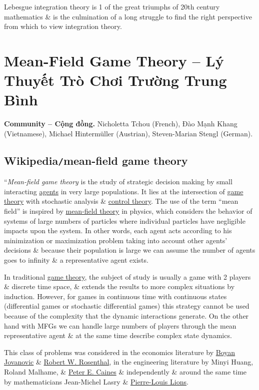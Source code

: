 \documentclass{article}
\begin{document}
Lebesgue integration theory is 1 of the great triumphs of 20th century mathematics \& is the culmination of a long struggle to find the right perspective from which to view integration theory.


\section{Mean-Field Game Theory -- Lý Thuyết Trò Chơi Trường Trung Bình}
\textbf{\textsf{Community -- Cộng đồng.}} {\sc Nicholetta Tchou (French), Đào Mạnh Khang (Vietnamese), Michael Hinterm\"uller (Austrian), Steven-Marian Stengl (German)}.

\subsection{Wikipedia{\tt/}mean-field game theory}
``{\it Mean-field game theory} is the study of strategic decision making by small interacting \href{https://en.wikipedia.org/wiki/Agent_(economics)}{agents} in very large populations. It lies at the intersection of \href{https://en.wikipedia.org/wiki/Game_theory}{game theory} with stochastic analysis \& \href{https://en.wikipedia.org/wiki/Control_theory}{control theory}. The use of the term ``mean field'' is inspired by \href{https://en.wikipedia.org/wiki/Mean-field_theory}{mean-field theory} in physics, which considers the behavior of systems of large numbers of particles where individual particles have negligible impacts upon the system. In other words, each agent acts according to his minimization or maximization problem taking into account other agents' decisions \& because their population is large we can assume the number of agents goes to infinity \& a representative agent exists.

In traditional \href{https://en.wikipedia.org/wiki/Game_theory}{game theory}, the subject of study is usually a game with 2 players \& discrete time space, \& extends the results to more complex situations by induction. However, for games in continuous time with continuous states (differential games or stochastic differential games) this strategy cannot be used because of the complexity that the dynamic interactions generate. On the other hand with MFGs we can handle large numbers of players through the mean representative agent \& at the same time describe complex state dynamics.

This class of problems was considered in the economics literature by \href{https://en.wikipedia.org/wiki/Boyan_Jovanovic}{Boyan Jovanovic} \& \href{https://en.wikipedia.org/wiki/Robert_W._Rosenthal}{Robert W. Rosenthal}, in the engineering literature by Minyi Huang, Roland Malhame, \& \href{https://en.wikipedia.org/wiki/Peter_E._Caines}{Peter E. Caines} \& independently \& around the same time by mathematicians Jean-Michel Lasry \& \href{https://en.wikipedia.org/wiki/Pierre-Louis_Lions}{Pierre-Louis Lions}.
\end{document}
